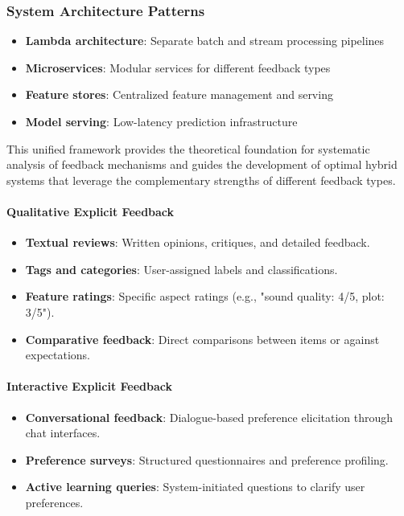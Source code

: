 \subsubsection{System Architecture Patterns}
\begin{itemize}
    \item \textbf{Lambda architecture}: Separate batch and stream processing pipelines
    \item \textbf{Microservices}: Modular services for different feedback types
    \item \textbf{Feature stores}: Centralized feature management and serving
    \item \textbf{Model serving}: Low-latency prediction infrastructure
\end{itemize}

This unified framework provides the theoretical foundation for systematic analysis of feedback mechanisms and guides the development of optimal hybrid systems that leverage the complementary strengths of different feedback types.

\paragraph{Qualitative Explicit Feedback}
\begin{itemize}
    \item \textbf{Textual reviews}: Written opinions, critiques, and detailed feedback.
    \item \textbf{Tags and categories}: User-assigned labels and classifications.
    \item \textbf{Feature ratings}: Specific aspect ratings (e.g., "sound quality: 4/5, plot: 3/5").
    \item \textbf{Comparative feedback}: Direct comparisons between items or against expectations.
\end{itemize}

\paragraph{Interactive Explicit Feedback}
\begin{itemize}
    \item \textbf{Conversational feedback}: Dialogue-based preference elicitation through chat interfaces.
    \item \textbf{Preference surveys}: Structured questionnaires and preference profiling.
    \item \textbf{Active learning queries}: System-initiated questions to clarify user preferences.
\end{itemize}

